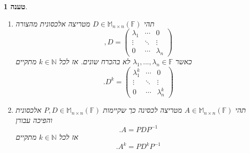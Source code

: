 \documentclass[12pt]{report}
\theoremstyle{plain}
\newtheorem{proposition}[theorem]{טענה}
\theoremstyle{definition}
\newcommand{\N}{\mathbb{N}}
\newcommand{\F}{\mathbb{F}}
\newcommand{\M}{\mathbb{M}}
\newcommand{\0}{\mathbf{0}}
\begin{document}
\begin{proposition}\label{prop:matrix-power}\
\begin{enumerate}[label=\alph*.]
\item 
תהי
$D\in\M_{n\times n}(\F)$
מטריצה אלכסונית מהצורה
$$
,D=\begin{pmatrix}
\lambda_1 & \cdots & 0 \\
\vdots & \ddots & \vdots \\
0 & \cdots & \lambda_n
\end{pmatrix}
$$
כאשר 
$\lambda_1,...,\lambda_n\in\F$
לא בהכרח שונים.
אז לכל
$k\in\N$
מתקיים
$$
.D^k=\begin{pmatrix}
\lambda_1^k & \cdots & 0 \\
\vdots & \ddots & \vdots \\
0 & \cdots & \lambda_n^k
\end{pmatrix}
$$


\item 
תהי
$A\in\M_{n\times n}(\F)$
מטריצה לכסינה כך שקיימות
$P,D\in\M_{n\times n}(\F)$
אלכסונית והפיכה עבורן
$$
.A=PDP^{-1}
$$
אז לכל
$k\in\N$
מתקיים
$$
.A^k=PD^kP^{-1}
$$


\end{enumerate}
\end{proposition}
\end{document}
